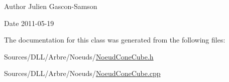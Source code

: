 \begin{DoxyAuthor}{Author}
Julien Gascon-\/\+Samson 
\end{DoxyAuthor}
\begin{DoxyDate}{Date}
2011-\/05-\/19 
\end{DoxyDate}


The documentation for this class was generated from the following files\+:\begin{DoxyCompactItemize}
\item 
Sources/\+D\+L\+L/\+Arbre/\+Noeuds/\hyperlink{_noeud_cone_cube_8h}{Noeud\+Cone\+Cube.\+h}\item 
Sources/\+D\+L\+L/\+Arbre/\+Noeuds/\hyperlink{_noeud_cone_cube_8cpp}{Noeud\+Cone\+Cube.\+cpp}\end{DoxyCompactItemize}
